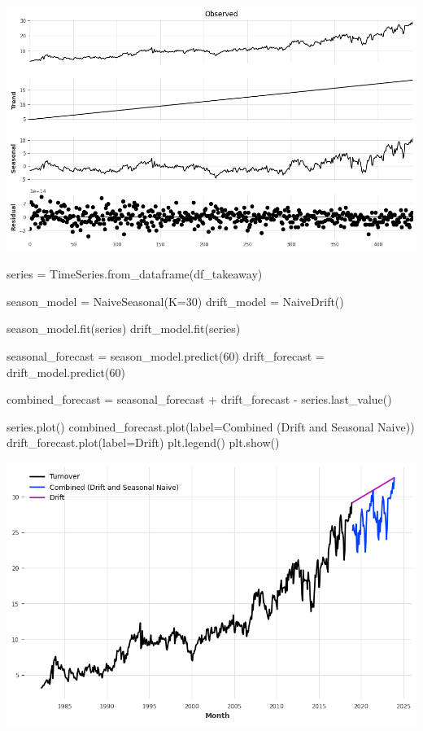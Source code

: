 \documentclass[
  11pt,
]{article}
\newenvironment{Shaded}{\begin{snugshade}}{\end{snugshade}}
\newcommand{\DecValTok}[1]{\textcolor[rgb]{0.68,0.00,0.00}{#1}}
\newcommand{\NormalTok}[1]{\textcolor[rgb]{0.00,0.23,0.31}{#1}}
\newcommand{\OperatorTok}[1]{\textcolor[rgb]{0.37,0.37,0.37}{#1}}
\newcommand{\StringTok}[1]{\textcolor[rgb]{0.13,0.47,0.30}{#1}}
\begin{document}
\includegraphics{hw3_files/figure-pdf/cell-27-output-1.png}

\begin{Shaded}
\begin{Highlighting}[]
\NormalTok{series }\OperatorTok{=}\NormalTok{ TimeSeries.from\_dataframe(df\_takeaway)}

\NormalTok{season\_model }\OperatorTok{=}\NormalTok{ NaiveSeasonal(K}\OperatorTok{=}\DecValTok{30}\NormalTok{) }
\NormalTok{drift\_model }\OperatorTok{=}\NormalTok{ NaiveDrift()}

\NormalTok{season\_model.fit(series)}
\NormalTok{drift\_model.fit(series)}

\NormalTok{seasonal\_forecast }\OperatorTok{=}\NormalTok{ season\_model.predict(}\DecValTok{60}\NormalTok{)}
\NormalTok{drift\_forecast }\OperatorTok{=}\NormalTok{ drift\_model.predict(}\DecValTok{60}\NormalTok{)}

\NormalTok{combined\_forecast }\OperatorTok{=}\NormalTok{ seasonal\_forecast }\OperatorTok{+}\NormalTok{ drift\_forecast }\OperatorTok{{-}}\NormalTok{ series.last\_value()}

\NormalTok{series.plot()}
\NormalTok{combined\_forecast.plot(label}\OperatorTok{=}\StringTok{\textquotesingle{}Combined (Drift and Seasonal Naive)\textquotesingle{}}\NormalTok{)}
\NormalTok{drift\_forecast.plot(label}\OperatorTok{=}\StringTok{\textquotesingle{}Drift\textquotesingle{}}\NormalTok{)}
\NormalTok{plt.legend()}
\NormalTok{plt.show()}
\end{Highlighting}
\end{Shaded}

\includegraphics{hw3_files/figure-pdf/cell-28-output-1.png}
\end{document}
